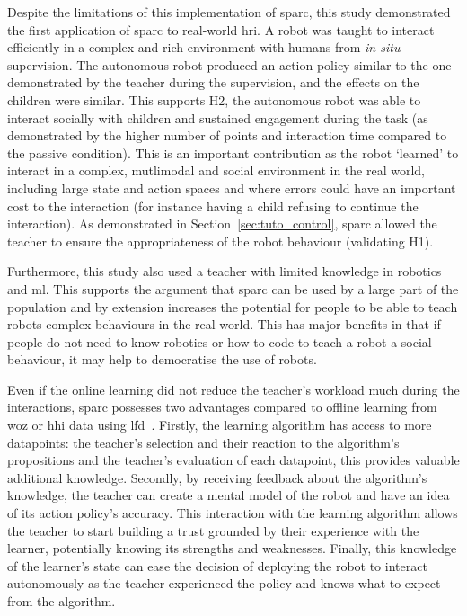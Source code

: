 Despite the limitations of this implementation of \gls{sparc}, this study demonstrated the first application of \gls{sparc} to real-world \gls{hri}. A robot was taught to interact efficiently in a complex and rich environment with humans from \textit{in situ} supervision. The autonomous robot produced an action policy similar to the one demonstrated by the teacher during the supervision, and the effects on the children were similar. This supports H2, the autonomous robot was able to interact socially with children and sustained engagement during the task (as demonstrated by the higher number of points and interaction time compared to the passive condition). This is an important contribution as the robot `learned' to interact in a complex, mutlimodal and social environment in the real world, including large state and action spaces and where errors could have an important cost to the interaction (for instance having a child refusing to continue the interaction). As demonstrated in Section~\ref{sec:tuto_control}, \gls{sparc} allowed the teacher to ensure the appropriateness of the robot behaviour (validating H1).

Furthermore, this study also used a teacher with limited knowledge in robotics and \gls{ml}. This supports the argument that \gls{sparc} can be used by a large part of the population and by extension increases the potential for people to be able to teach robots complex behaviours in the real-world. This has major benefits in that if people do not need to know robotics or how to code to teach a robot a social behaviour, it may help to democratise the use of robots. 

Even if the online learning did not reduce the teacher's workload much during the interactions, \gls{sparc} possesses two advantages compared to offline learning from \gls{woz} or \gls{hhi} data using \gls{lfd}~\citep{sequeira2016discovering,liu2014train}. Firstly, the learning algorithm has access to more datapoints: the teacher's selection and their reaction to the algorithm's propositions and the teacher's evaluation of each datapoint, this provides valuable additional knowledge. Secondly, by receiving feedback about the algorithm's knowledge, the teacher can create a mental model of the robot and have an idea of its action policy's accuracy. This interaction with the learning algorithm allows the teacher to start building a trust grounded by their experience with the learner, potentially knowing its strengths and weaknesses. Finally, this knowledge of the learner's state can ease the decision of deploying the robot to interact autonomously as the teacher experienced the policy and knows what to expect from the algorithm.

